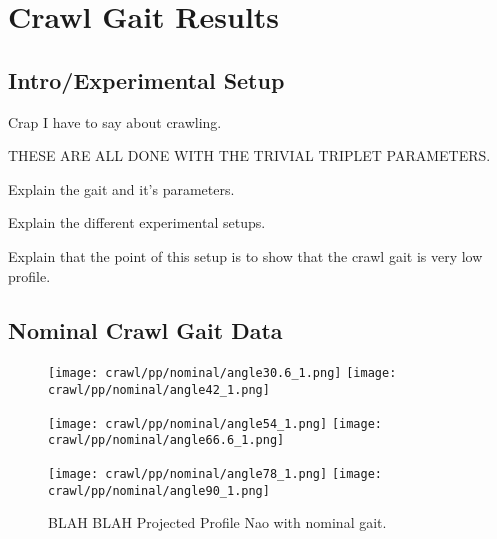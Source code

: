 \chapter{Crawl Gait Results} \label{ch:results_crawl_gait}



\section{Intro/Experimental Setup}
Crap I have to say about crawling.

THESE ARE ALL DONE WITH THE TRIVIAL TRIPLET PARAMETERS.

Explain the gait and it's parameters.

Explain the different experimental setups.

Explain that the point of this setup is to show that the crawl gait is very low profile.

\section{Nominal Crawl Gait Data}

\begin{figure}
  \centerline{
    \texttt{[image: crawl/pp/nominal/angle30.6\_1.png]}
    \texttt{[image: crawl/pp/nominal/angle42\_1.png]}
  }
  \centerline{
    \texttt{[image: crawl/pp/nominal/angle54\_1.png]}
    \texttt{[image: crawl/pp/nominal/angle66.6\_1.png]}
  }
  \centerline{
    \texttt{[image: crawl/pp/nominal/angle78\_1.png]}
    \texttt{[image: crawl/pp/nominal/angle90\_1.png]}
  }
  \caption{BLAH BLAH Projected Profile Nao with nominal gait.}
  \label{fig:pp_nom_gait1}
\end{figure}

